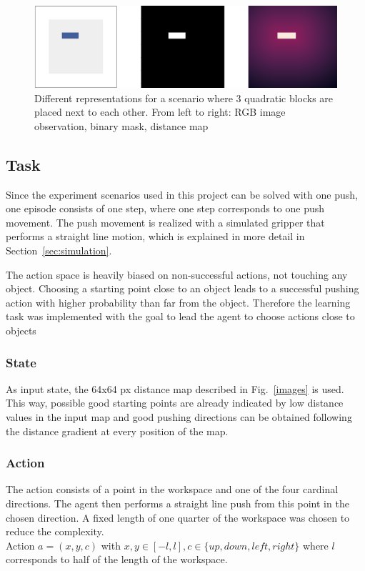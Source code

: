 \documentclass{article}
\newcommand{\myfigref}[1]{Fig.~\ref{#1}}
\newcommand{\mysecref}[1]{Section~\ref{#1}}
\begin{document}
\begin{figure}[!ht]
\centering
\includegraphics[width=14cm]{figures/observations.png}
\caption{Different representations for a scenario where 3 quadratic blocks are placed next to each other. From left to right: RGB image observation, binary mask, distance map
}
\label{fig:observations}
\end{figure}

\subsection{Task}
Since the experiment scenarios used in this project can be solved with one push, one episode consists of one step, where one step corresponds to one push movement. The push movement is realized with a simulated gripper that performs a straight line motion, which is explained in more detail in \mysecref{sec:simulation}. 

The action space is heavily biased on non-successful actions, not touching any object. Choosing a starting point close to an object leads to a successful pushing action with higher probability than far from the object.  Therefore the learning task was implemented with the goal to lead the agent to choose actions close to objects

\subsubsection{State}
As input state, the 64x64 px distance map described in \myfigref{images} is used. This way, possible good starting points are already indicated by low distance values in the input map and good pushing directions can be obtained following the distance gradient at every position of the map. 

\subsubsection{Action}
The action consists of a point in the workspace and one of the four cardinal directions. The agent then performs a straight line push from this point in the chosen direction. A fixed length of one quarter of the workspace was chosen to reduce the complexity. \\
 Action $ a = (x,y,c)$ with $x,y  \in [-l,l] , c \in \{up,down,left,right\}$ where $l$ corresponds to half of the length of the workspace.
\end{document}
